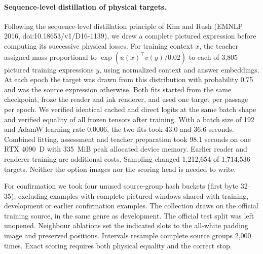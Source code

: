\paragraph{Sequence-level distillation of physical targets.}
Following the sequence-level distillation principle of Kim and Rush
(EMNLP 2016, doi:10.18653/v1/D16-1139), we drew a complete pictured
expression before computing its successive physical losses. For training
context $x$, the teacher assigned mass proportional to
$\exp(u(x)^\top v(y)/0.02)$ to each of 3,805 pictured training expressions
$y$, using normalized context and answer embeddings. At each epoch the
target was drawn from this distribution with probability 0.75 and was
the source expression otherwise. Both fits started from the same
checkpoint, froze the reader and ink renderer, and used one target per
passage per epoch. We verified identical cached and direct logits at
the same batch shape and verified equality of all frozen tensors after
training. With a batch size of 192 and AdamW learning rate 0.0006, the
two fits took 43.0 and 36.6 seconds. Combined fitting, assessment and
teacher preparation took 98.1 seconds on one RTX 4090~D with 335~MiB
peak allocated device memory. Earlier reader and renderer training are
additional costs. Sampling changed 1,212,654 of 1,714,536 targets.
Neither the option images nor the scoring head is needed to write.

For confirmation we took four unused source-group hash buckets (first
byte 32--35), excluding examples with complete pictured windows shared
with training, development or earlier confirmation examples. The
collection draws on the official training source, in the same genre
as development. The official test split was left unopened. Neighbour
ablations set the indicated slots to the all-white padding image and
preserved positions. Intervals resample complete source groups 2,000
times. Exact scoring requires both physical equality and the correct stop.
